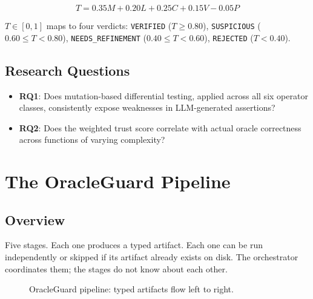 \documentclass[conference]{IEEEtran}
\begin{document}
\[
T = 0.35M + 0.20L + 0.25C + 0.15V - 0.05P
\]

$T \in [0,1]$ maps to four verdicts: \texttt{VERIFIED} ($T \geq 0.80$), \texttt{SUSPICIOUS} ($0.60 \leq T < 0.80$), \texttt{NEEDS\_REFINEMENT} ($0.40 \leq T < 0.60$), \texttt{REJECTED} ($T < 0.40$).

\subsection{Research Questions}

\begin{itemize}
\item \textbf{RQ1}: Does mutation-based differential testing, applied across all six operator classes, consistently expose weaknesses in LLM-generated assertions?
\item \textbf{RQ2}: Does the weighted trust score correlate with actual oracle correctness across functions of varying complexity?
\end{itemize}

\section{The OracleGuard Pipeline}

\subsection{Overview}

Five stages. Each one produces a typed artifact. Each one can be run independently or skipped if its artifact already exists on disk. The orchestrator coordinates them; the stages do not know about each other.

\begin{figure}[t]
\centering
{}
\caption{OracleGuard pipeline: typed artifacts flow left to right.}
\label{fig:og-pipeline}
\end{figure}
\end{document}
